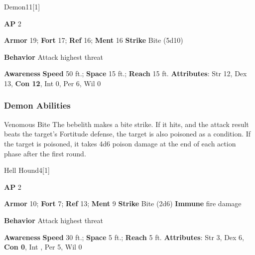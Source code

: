 \begin{monsection}[Bebelith]{Demon}{11}[1]
\vspace{-1em}\vspace{-1em}
\begin{spellcontent}
\begin{spelltargetinginfo}
{\textbf{AP} 2}

\pari \textbf{Armor} 19;
\textbf{Fort} 17;
\textbf{Ref} 16;
\textbf{Ment} 16
\pari \textbf{Strike} Bite  (5d10)



\pari \textbf{Behavior} Attack highest threat
\end{spelltargetinginfo}
\end{spellcontent}

\begin{monsterfooter}
\pari \textbf{Awareness} 
\pari \textbf{Speed} 50 ft.;
\textbf{Space} 15 ft.;
\textbf{Reach} 15 ft.
\pari \textbf{Attributes}:
Str 12,
Dex 13,
\textbf{Con 12},
Int 0,
Per 6,
Wil 0
\end{monsterfooter}
\end{monsection}


\subsubsection{Demon Abilities}

\begin{ability}{Venomous Bite}
The bebelith makes a bite strike.
If it hits, and the attack result beats the target's Fortitude defense, the target is also poisoned as a condition.
If the target is poisoned, it takes 4d6 poison damage at the end of each action phase after the first round.
\end{ability}






\begin{monsection}{Hell Hound}{4}[1]
\vspace{-1em}\vspace{-1em}
\begin{spellcontent}
\begin{spelltargetinginfo}
{\textbf{AP} 2}

\pari \textbf{Armor} 10;
\textbf{Fort} 7;
\textbf{Ref} 13;
\textbf{Ment} 9
\pari \textbf{Strike} Bite  (2d6)
\pari \textbf{Immune} fire damage


\pari \textbf{Behavior} Attack highest threat
\end{spelltargetinginfo}
\end{spellcontent}

\begin{monsterfooter}
\pari \textbf{Awareness} 
\pari \textbf{Speed} 30 ft.;
\textbf{Space} 5 ft.;
\textbf{Reach} 5 ft.
\pari \textbf{Attributes}:
Str 3,
Dex 6,
\textbf{Con 0},
Int ,
Per 5,
Wil 0
\end{monsterfooter}
\end{monsection}


